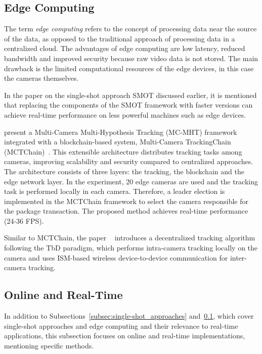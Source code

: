 \subsection{Edge Computing}\label{subsec:edge_computing}
The term \textit{edge computing} refers to the concept of processing data near the source of the data, as opposed to the traditional approach of processing data in a centralized cloud. The advantages of edge computing are low latency, reduced bandwidth and improved security because raw video data is not stored. The main drawback is the limited computational resources of the edge devices, in this case the cameras themselves.

In the paper on the single-shot approach SMOT discussed earlier, it is mentioned that replacing the components of the SMOT framework with faster versions can achieve real-time performance on less powerful machines such as edge devices.

\citeauthor{Wang23b} present a Multi-Camera Multi-Hypothesis Tracking (MC-MHT) framework integrated with a blockchain-based system, Multi-Camera TrackingChain (MCTChain)~\cite{Wang23b}. This extensible architecture distributes tracking tasks among cameras, improving scalability and security compared to centralized approaches. The architecture consists of three layers: the tracking, the blockchain and the edge network layer. In the experiment, 20 edge cameras are used and the tracking task is performed locally in each camera. Therefore, a leader election is implemented in the MCTChain framework to select the camera responsible for the package transaction. The proposed method achieves real-time performance (24-36 FPS).

Similar to MCTChain, the paper ~\cite{Nikodem20} introduces a decentralized tracking algorithm following the TbD paradigm, which performs intra-camera tracking locally on the camera and uses ISM-based wireless device-to-device communication for inter-camera tracking.

\subsection{Online and Real-Time}\label{subsec:online_and_real-time}
In addition to Subsections~\ref{subsec:single-shot_approaches} and~\ref{subsec:edge_computing}, which cover single-shot approaches and edge computing and their relevance to real-time applications, this subsection focuses on online and real-time implementations, mentioning specific methods.

